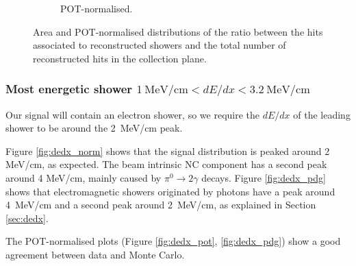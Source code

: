 \begin{figure}[htbp]
\begin{subfigure}{0.49\textwidth}
    \caption{POT-normalised.} \label{fig:ratio_pot}
  \end{subfigure}
  \caption{Area and POT-normalised distributions of the ratio between the hits associated to reconstructed showers and the total number of reconstructed hits in the collection plane.}
\end{figure}


\subsubsection*{Most energetic shower $1~\mathrm{MeV/cm} < dE/dx <3.2~\mathrm{MeV/cm}$}
Our signal will contain an electron shower, so we require the $dE/dx$ of the leading shower to be around the 2~MeV/cm peak.

Figure \ref{fig:dedx_norm} shows that the signal distribution is peaked around 2 MeV/cm, as expected. The beam intrinsic NC component has a second peak around 4 MeV/cm, mainly caused by $\pi^0\rightarrow2\gamma$ decays. 
Figure \ref{fig:dedx_pdg} shows that electromagnetic showers originated by photons have a peak around 4~MeV/cm and a second peak around 2~MeV/cm, as explained in Section \ref{sec:dedx}. 

The POT-normalised plots (Figure \ref{fig:dedx_pot}, \ref{fig:dedx_pdg}) show a good agreement between data and Monte Carlo.

